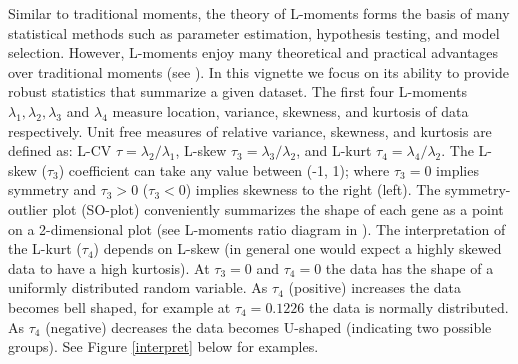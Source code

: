 \documentclass[a4paper, 10pt]{article}\usepackage[]{graphicx}\usepackage[]{color}
\begin{document}
\noindent Similar to traditional moments,
the theory of L-moments
forms the basis of many statistical methods 
such as parameter estimation, hypothesis testing, 
and model selection. However, L-moments enjoy 
many theoretical and practical advantages over
traditional moments 
(see \cite{Kirby1974, Hosking1990, Vogel1993, Delicado2008}).
In this vignette we focus on its ability to
provide robust statistics that summarize a given 
dataset.
The first four L-moments $\lambda_1, \lambda_2, \lambda_3$ 
and $\lambda_4$ measure location, variance,
skewness, and kurtosis of data respectively. 
Unit free measures of relative variance, skewness,
and kurtosis are defined as: 
L-CV $\tau = \lambda_2 / \lambda_1$, 
L-skew $\tau_3 = \lambda_3 / \lambda_2$,
and 
L-kurt $\tau_4 = \lambda_4 / \lambda_2$.
The L-skew ($\tau_3$) coefficient can take any
value between (-1, 1); where $\tau_3=0$ implies symmetry
and $\tau_3 > 0$ ($\tau_3 < 0$) implies skewness to 
the right (left).
The symmetry-outlier plot (SO-plot) 
conveniently summarizes the shape of each gene as a point
on a 2-dimensional plot 
(see L-moments ratio diagram in \cite{Hosking1990}).
The interpretation of the L-kurt ($\tau_4$) 
depends on L-skew (in general one would expect a 
highly skewed data to have a high kurtosis).
At $\tau_3 = 0$ and $\tau_4 = 0$ the data has the shape 
of a uniformly distributed random variable.
As $\tau_4$ (positive) increases the data becomes bell
shaped, for example at $\tau_4 = 0.1226$ the data is 
normally distributed. 
As $\tau_4$ (negative) decreases the data becomes 
U-shaped (indicating two possible groups). 
See Figure \ref{interpret} below for examples. 
\end{document}
